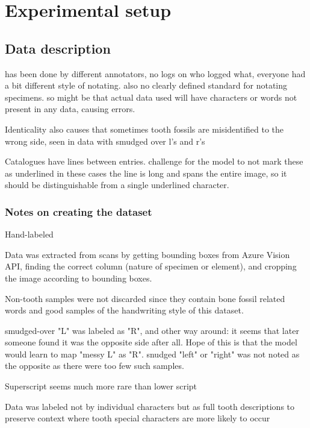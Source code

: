 \documentclass{article}
\begin{document}
\section{Experimental setup}


\subsection{Data description}

has been done by different annotators, no logs on who logged what, everyone 
had a bit different style of notating. also no clearly defined standard 
for notating specimens. so might be that actual data used will have 
characters or words not present in any data, causing errors.


Identicality also causes that sometimes tooth fossils are misidentified to 
the wrong side, seen in data with smudged over l's and r's

Catalogues have lines between entries. challenge for the model to not mark these as underlined
in these cases the line is long and spans the entire image, so it should be distinguishable from 
a single underlined character.

\subsubsection{Notes on creating the dataset}

Hand-labeled

Data was extracted from scans by getting bounding boxes from Azure Vision API,
finding the correct column (nature of specimen or element), and cropping the image 
according to bounding boxes.

Non-tooth samples were not discarded since they contain 
bone fossil related words and good samples of the handwriting style of this dataset.

smudged-over "L" was labeled as "R", and other way around: it seems that later 
someone found it was the opposite side after all. Hope of this is that the model 
would learn to map "messy L" as "R". snudged "left" or "right" was not noted as the 
opposite as there were too few such samples.

Superscript seems much more rare than lower script

Data was labeled not by individual characters but as full tooth descriptions
to preserve context where tooth special characters are more likely to occur
\end{document}
